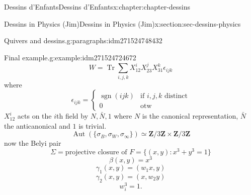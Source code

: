 \documentclass[oneside,10pt,]{book}
\numberwithin{equation}{section}
\newcommand{\ZZ}{\mathbf{Z}}
\DeclareMathOperator{\sgn}{sgn}
\DeclareMathOperator{\trace}{Tr}
\DeclareMathOperator{\Aut}{Aut}
\newcommand{\amp}{&}
\begin{document}
\begin{chapterptx}{Dessins d'Enfants}{}{Dessins d'Enfants}{}{}{x:chapter:chapter-dessins}
\begin{sectionptx}{Dessins in Physics (Jim)}{}{Dessins in Physics (Jim)}{}{}{x:section:sec-dessins-physics}
\begin{paragraphs}{Quivers and dessins.}{g:paragraphs:idm271524748432}
\begin{example}{Final example.}{g:example:idm271524724672}
\begin{equation*}
W = \trace \sum_{i,j,k} X_{12}^iX_{23}^j X_{31}^k \epsilon_{ijk}
\end{equation*}
where%
\begin{equation*}
\epsilon_{ijk} = \begin{cases} \sgn(ijk) \amp\text{if }i,j,k \text{ distinct}\\ 0 \amp\text{otw}\end{cases}
\end{equation*}
\(X_{12}^i\) acts on the \(i\)th field by \(N, \bar N, 1\) where \(N\) is the canonical representation, \(\bar N\) the anticanonical and \(1\) is trivial.%
\begin{equation*}
\Aut(\{\sigma_B,\sigma_W, \sigma_\infty\})  \simeq \ZZ/3\ZZ\times \ZZ/3\ZZ
\end{equation*}
now the Belyi pair%
\begin{equation*}
\Sigma = \text{projective closure of } F = \{(x,y) : x^3+ y^3 =1\}
\end{equation*}
%
\begin{equation*}
\beta(x,y) = x^3
\end{equation*}
%
\begin{equation*}
\gamma_1(x,y) = (w_1 x, y)
\end{equation*}
%
\begin{equation*}
\gamma_2(x,y) = (x,w_2  y)
\end{equation*}
%
\begin{equation*}
w_i^3 = 1\text{.}
\end{equation*}
%
\end{example}
\end{paragraphs}%
\end{sectionptx}
\end{chapterptx}
%
%
\typeout{************************************************}
\typeout{************************************************}
%
\end{document}
